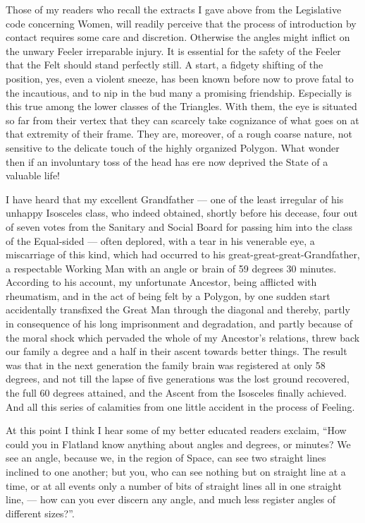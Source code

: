 \documentclass[12pt, a4paper, oneside]{memoir}
\begin{document}
Those of my readers who recall the extracts I gave above from the Legislative
code concerning Women, will readily perceive that the process of introduction
by contact requires some care and discretion. Otherwise the angles might
inflict on the unwary Feeler irreparable injury. It is essential for the
safety of the Feeler that the Felt should stand perfectly still. A start, a
fidgety shifting of the position, yes, even a violent sneeze, has been known
before now to prove fatal to the incautious, and to nip in the bud many a
promising friendship. Especially is this true among the lower classes of the
Triangles. With them, the eye is situated so far from their vertex that they
can scarcely take cognizance of what goes on at that extremity of their frame.
They are, moreover, of a rough coarse nature, not sensitive to the delicate
touch of the highly organized Polygon. What wonder then if an involuntary toss
of the head has ere now deprived the State of a valuable life!

I have heard that my excellent Grandfather --- one of the least irregular of his
unhappy Isosceles class, who indeed obtained, shortly before his decease, four
out of seven votes from the Sanitary and Social Board for passing him into the
class of the Equal-sided --- often deplored, with a tear in his venerable eye, a
miscarriage of this kind, which had occurred to his
great-great-great-Grandfather, a respectable Working Man with an angle or
brain of 59 degrees 30 minutes. According to his account, my unfortunate
Ancestor, being afflicted with rheumatism, and in the act of being felt by a
Polygon, by one sudden start accidentally transfixed the Great Man through the
diagonal and thereby, partly in consequence of his long imprisonment and
degradation, and partly because of the moral shock which pervaded the whole of
my Ancestor's relations, threw back our family a degree and a half in their
ascent towards better things. The result was that in the next generation the
family brain was registered at only 58 degrees, and not till the lapse of five
generations was the lost ground recovered, the full 60 degrees attained, and
the Ascent from the Isosceles finally achieved. And all this series of
calamities from one little accident in the process of Feeling.

At this point I think I hear some of my better educated readers exclaim, ``How
could you in Flatland know anything about angles and degrees, or minutes? We
see an angle, because we, in the region of Space, can see two straight lines
inclined to one another; but you, who can see nothing but on straight line at
a time, or at all events only a number of bits of straight lines all in one
straight line, --- how can you ever discern any angle, and much less register
angles of different sizes?''.
\end{document}
